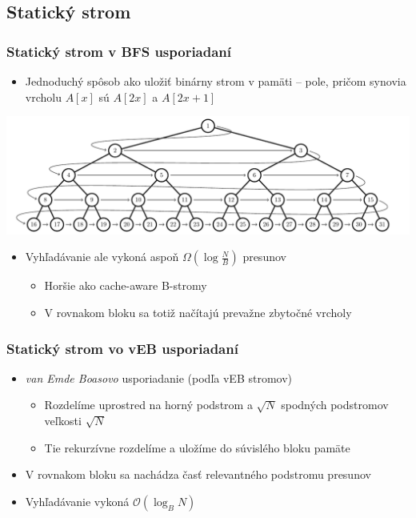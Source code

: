 \documentclass{beamer}
\newcommand{\bigO}{\ensuremath{\mathcal{O}}}
\begin{document}
\subsection{Statický strom}
\begin{frame}
    \frametitle{Statický strom v BFS usporiadaní}
    \begin{itemize}
        \item Jednoduchý spôsob ako uložiť binárny strom v pamäti -- pole, pričom synovia vrcholu $A[x]$ sú $A[2x]$ a $A[2x+1]$
    \end{itemize}

    \centerline{\includegraphics[width=1.1\textwidth]{../figures/vEB_tree/node_order_naive}}
    \begin{itemize}
        \item Vyhľadávanie ale vykoná aspoň $\Omega(\log\frac{N}{B})$ presunov
        \begin{itemize}
            \item Horšie ako cache-aware B-stromy
            \item V rovnakom bloku sa totiž načítajú prevažne zbytočné vrcholy
        \end{itemize}
    \end{itemize}
\end{frame}

\begin{frame}
    \frametitle{Statický strom vo vEB usporiadaní}
    \begin{itemize}
        \item \emph{van Emde Boasovo} usporiadanie (podľa vEB stromov)
        \begin{itemize}
            \item Rozdelíme uprostred na horný podstrom a $\sqrt{N}$ spodných podstromov veľkosti $\sqrt{N}$
            \item Tie rekurzívne rozdelíme a uložíme do súvislého bloku pamäte
        \end{itemize}
    \end{itemize}
    \resizebox{\textwidth}{!}{%
            
    }  
    \begin{itemize}
        \item V rovnakom bloku sa nachádza časť relevantného podstromu presunov
        \item Vyhľadávanie vykoná $\bigO(\log_B N)$
    \end{itemize}
\end{frame}
\end{document}
